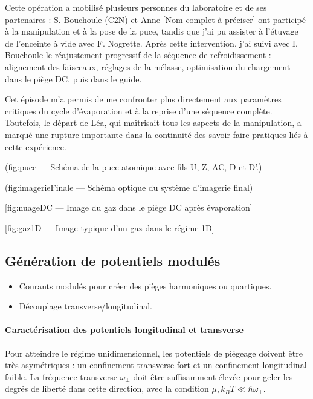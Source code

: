 Cette opération a mobilisé plusieurs personnes du laboratoire et de ses partenaires : S. Bouchoule (C2N) et Anne [Nom complet à préciser] ont participé à la manipulation et à la pose de la puce, tandis que j’ai pu assister à l’étuvage de l’enceinte à vide avec F. Nogrette. Après cette intervention, j’ai suivi avec I. Bouchoule le réajustement progressif de la séquence de refroidissement : alignement des faisceaux, réglages de la mélasse, optimisation du chargement dans le piège DC, puis dans le guide.

Cet épisode m’a permis de me confronter plus directement aux paramètres critiques du cycle d’évaporation et à la reprise d’une séquence complète. Toutefois, le départ de Léa, qui maîtrisait tous les aspects de la manipulation, a marqué une rupture importante dans la continuité des savoir-faire pratiques liés à cette expérience.


\begin{center}
	({fig:puce} — Schéma de la puce atomique avec fils U, Z, AC, D et D'.)
\end{center}
\begin{center}
	({fig:imagerieFinale} — Schéma optique du système d’imagerie final)
\end{center}
\begin{center}
	[{fig:nuageDC} — Image du gaz dans le piège DC après évaporation]
\end{center}
\begin{center}
	[{fig:gaz1D} — Image typique d’un gaz dans le régime 1D]
\end{center}



\subsection{Génération de potentiels modulés}
\begin{itemize}
    \item Courants modulés pour créer des pièges harmoniques ou quartiques.
    \item Découplage transverse/longitudinal.
\end{itemize}

\paragraph{Caractérisation des potentiels longitudinal et transverse}

Pour atteindre le régime unidimensionnel, les potentiels de piégeage doivent être très asymétriques : un confinement transverse fort et un confinement longitudinal faible. La fréquence transverse \(\omega_\perp\) doit être suffisamment élevée pour geler les degrés de liberté dans cette direction, avec la condition \(\mu, k_B T \ll \hbar \omega_\perp\).

